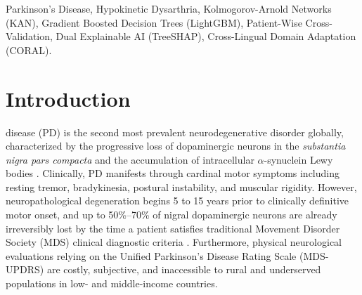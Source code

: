 \documentclass[journal,10pt,twoside]{IEEEtran}
\begin{document}
\begin{abstract}
adaptation boosts target accuracy from $74.56\%$ (zero-shot LightGBM) to $84.67 \pm 1.74\%$ (F1 $= 85.70\%$, AUC $= 0.9319$). \textit{Conclusion:} Dual Explainable AI (XAI) combining TreeSHAP and KAN B-spline functional visualization confirms that second Mel-frequency cepstral coefficients (\texttt{mean\_MFCC\_2nd\_coef}), log-energy acceleration (\texttt{std\_delta\_delta\_log\_energy}), and mid-scale Tunable Q-Factor Wavelet Transform entropy (\texttt{tqwt\_entropy\_log\_dec\_12}) serve as language-invariant biomarkers of glottal incompetence and thyroarytenoid muscle rigidity, establishing a fast ($<0.2$~ms), compact ($\sim 165$~KB), and clinically interpretable paradigm for global tele-neurology.
\end{abstract}

\begin{IEEEkeywords}
Parkinson's Disease, Hypokinetic Dysarthria, Kolmogorov-Arnold Networks (KAN), Gradient Boosted Decision Trees (LightGBM), Patient-Wise Cross-Validation, Dual Explainable AI (TreeSHAP), Cross-Lingual Domain Adaptation (CORAL).
\end{IEEEkeywords}

\section{Introduction}
 disease (PD) is the second most prevalent neurodegenerative disorder globally, characterized by the progressive loss of dopaminergic neurons in the \textit{substantia nigra pars compacta} and the accumulation of intracellular $\alpha$-synuclein Lewy bodies \cite{ref40}. Clinically, PD manifests through cardinal motor symptoms including resting tremor, bradykinesia, postural instability, and muscular rigidity. However, neuropathological degeneration begins 5 to 15 years prior to clinically definitive motor onset, and up to 50\%--70\% of nigral dopaminergic neurons are already irreversibly lost by the time a patient satisfies traditional Movement Disorder Society (MDS) clinical diagnostic criteria \cite{ref40,ref43}. Furthermore, physical neurological evaluations relying on the Unified Parkinson's Disease Rating Scale (MDS-UPDRS) are costly, subjective, and inaccessible to rural and underserved populations in low- and middle-income countries.
\end{document}
